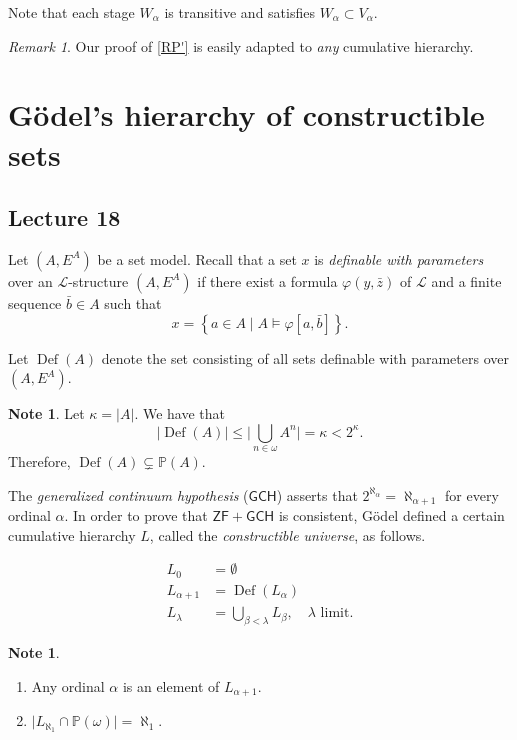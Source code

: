 \documentclass[10pt,letterpaper,cm]{nupset}
\theoremstyle{definition}
\newtheorem{note}[definition]{Note}
\theoremstyle{theorem}
\theoremstyle{remark}
\newtheorem{remark}[definition]{Remark}
\renewcommand{\L}{\mathcal L}
\renewcommand{\P}{\mathbb P}
\newcommand{\1}{\mathbf{1}}
\newcommand{\0}{\vec 0}
\newcommand{\zf}{\mathsf{ZF}}
\DeclareMathOperator{\Def}{Def}
\newcommand{\be}{\begin{enumerate}}
\newcommand{\ee}{\end{enumerate}}
\begin{document}
Note that each stage $W_{\alpha}$ is transitive and satisfies $W_{\alpha}\subset V_{\alpha}$.

\begin{remark}
Our proof of \cref{RP'} is easily adapted to \emph{any} cumulative hierarchy.
\end{remark}

\section{G\"odel's hierarchy of constructible sets}

\subsection{Lecture 18}

Let $\left(A, E^A\right)$ be a set model. Recall that a set $x$ is \textit{definable with parameters} over an $\L$-structure $\left(A, E^A\right)$ if there exist a formula $\varphi(y, \bar{z})$ of $\L$ and a finite sequence $\bar{b}\in A$ such that 
\[
x = \left\{a\in A \mid A \models \varphi[a, \bar{b}]\right\}.
\]

Let $\Def(A)$ denote the set consisting of all sets definable with parameters over $\left(A, E^A\right)$.

\begin{note}
Let $\kappa = \lvert{A}\rvert$. We have that $$\lvert{\Def(A)}\rvert \leq \lvert{\bigcup_{n\in \omega}A^n}\rvert = \kappa <2^{\kappa}.$$ Therefore, $\Def(A) \subsetneq \P(A)$.
\end{note}

\smallskip

The \textit{generalized continuum hypothesis} ($\mathsf{GCH}$) asserts that $2^{\aleph_{\alpha}} = \aleph_{\alpha+1}$ for every ordinal $\alpha$. In order to prove that $\zf + \mathsf{GCH}$ is consistent, G\"odel defined a certain cumulative hierarchy $L$, called the \textit{constructible universe}, as follows.

\begin{align*}
L_0 & = \emptyset 
\\ L_{\alpha +1}& =  \Def(L_{\alpha})
\\  L_{\lambda} & = \bigcup_{\beta < \lambda }L_{\beta},\quad  \lambda \text{ limit}.
\end{align*}

\begin{note} $ $
\be
\item Any ordinal $\alpha$ is an element of $L_{\alpha+1}$.
\item $\lvert{L_{\aleph_1} \cap \P(\omega)}\rvert =\aleph_1$.
\ee
\end{note}
\end{document}
